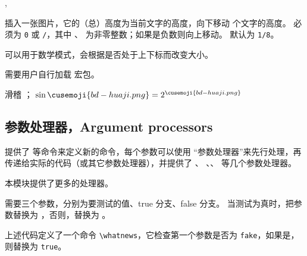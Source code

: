 \documentclass[twoside]{book}
\def\xampletext{\par}
\def\xampleprint{\xamplecode \xampleline \xampletext}
\begin{document}
\begin{function}{\cusemoji,\cusemojilowerratio}
  \begin{syntax}
    \V\cusemoji {}
  \end{syntax}
插入一张图片，它的（总）高度为当前文字的高度，向下移动  个文字的高度。
 必须为 \texttt{0} 或 \texttt/，其中 、
 为非零整数；如果是负数则向上移动。 默认为 \texttt{1/8}。

可以用于数学模式，会根据是否处于上下标而改变大小。

需要用户自行加载  宏包。
\end{function}

\begin{xample}
\newcommand{\bdhj}{}
滑稽 \bdhj ； $ \sin\bdhj = 2^\bdhj $
\stopxamplecode
\xampleprint
\end{xample}

\subsection{参数处理器，Argument processors}

 提供了  等命令来定义新的命令，每个参数可以使用
“参数处理器”来先行处理，再传递给实际的代码（或其它参数处理器），并提供了 、
\cmd\SplitArgument、\cmd\SplitList、 等几个参数处理器。

本模块提供了更多的处理器。

\begin{function}{\ReplaceArgumentIf}
  \begin{syntax}
    \V\ReplaceArgumentIf {}  
  \end{syntax}
 需要三个参数，分别为要测试的值、true 分支、false 分支。
当测试为真时，把参数替换为 ，否则，替换为 。
\end{function}


上述代码定义了一个命令 \verb|\whatnews|，它检查第一个参数是否为 \verb|fake|，如果是，
则替换为 \verb|true|。
\end{document}
